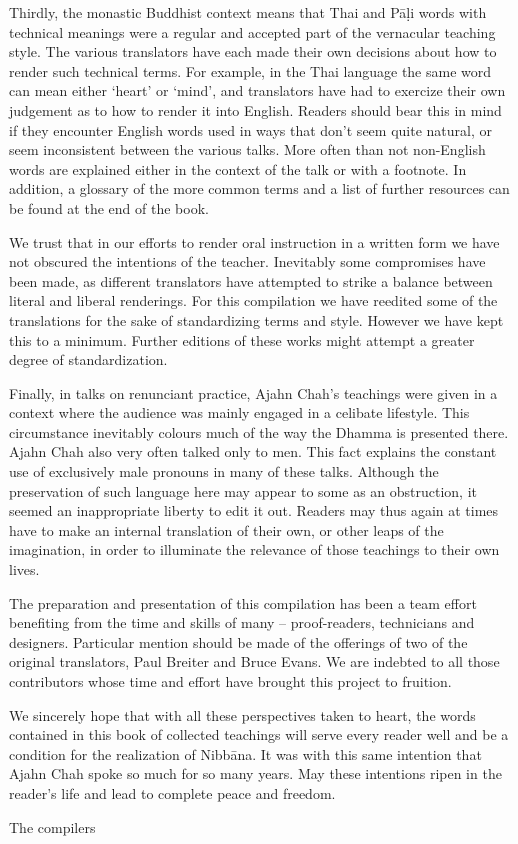 Thirdly, the monastic Buddhist context means that Thai and P\=a\d{l}i words with technical meanings were a regular and accepted part of the vernacular teaching style. The various translators have each made their own decisions about how to render such technical terms. For example, in the Thai language the same word can mean either `heart' or `mind', and translators have had to exercize their own judgement as to how to render it into English. Readers should bear this in mind if they encounter English words used in ways that don't seem quite natural, or seem inconsistent between the various talks. More often than not non-English words are explained either in the context of the talk or with a footnote. In addition, a glossary of the more common terms and a list of further resources can be found at the end of the book.

We trust that in our efforts to render oral instruction in a written form we have not obscured the intentions of the teacher. Inevitably some compromises have been made, as different translators have attempted to strike a balance between literal and liberal renderings. For this compilation we have reedited some of the translations for the sake of standardizing terms and style. However we have kept this to a minimum. Further editions of these works might attempt a greater degree of standardization.

Finally, in talks on renunciant practice, Ajahn Chah's teachings were given in a context where the audience was mainly engaged in a celibate lifestyle. This circumstance inevitably colours much of the way the Dhamma is presented there. Ajahn Chah also very often talked only to men. This fact explains the constant use of exclusively male pronouns in many of these talks. Although the preservation of such language here may appear to some as an obstruction, it seemed an inappropriate liberty to edit it out. Readers may thus again at times have to make an internal translation of their own, or other leaps of the imagination, in order to illuminate the relevance of those teachings to their own lives.

The preparation and presentation of this compilation has been a team effort benefiting from the time and skills of many -- proof-readers, technicians and designers. Particular mention should be made of the offerings of two of the original translators, Paul Breiter and Bruce Evans. We are indebted to all those contributors whose time and effort have brought this project to fruition.

We sincerely hope that with all these perspectives taken to heart, the words contained in this book of collected teachings will serve every reader well and be a condition for the realization of Nibb\=ana. It was with this same intention that Ajahn Chah spoke so much for so many years. May these intentions ripen in the reader's life and lead to complete peace and freedom.
\bigskip

{\raggedleft\par The compilers\par}

